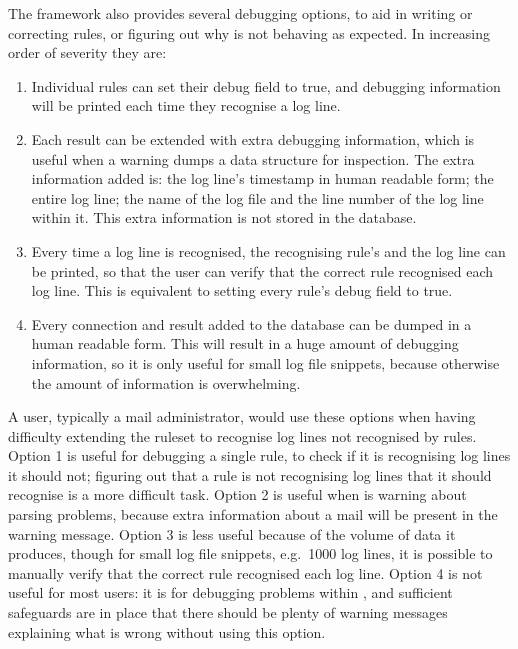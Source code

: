 The framework also provides several debugging options, to aid in writing or
correcting rules, or figuring out why \parsername{} is not behaving as
expected.  In increasing order of severity they are:

\begin{enumerate}

    \item Individual rules can set their debug field to true, and debugging
        information will be printed each time they recognise a log line.

    \item Each result can be extended with extra debugging information,
        which is useful when a warning dumps a data structure for
        inspection.  The extra information added is: the log line's
        timestamp in human readable form; the entire log line; the name of
        the log file and the line number of the log line within it.  This
        extra information is not stored in the database.

    \item Every time a log line is recognised, the recognising rule's
         and the log line can be printed, so that the user
        can verify that the correct rule recognised each log line.  This is
        equivalent to setting every rule's debug field to true.

    \item Every connection and result added to the database can be dumped
        in a human readable form.  This will result in a huge amount of
        debugging information, so it is only useful for small log file
        snippets, because otherwise the amount of information is
        overwhelming.

\end{enumerate}

A user, typically a mail administrator, would use these options when having
difficulty extending the ruleset to recognise log lines not recognised by
\parsernames{} \numberOFrules{} rules.  Option 1 is useful for debugging a
single rule, to check if it is recognising log lines it should not;
figuring out that a rule is not recognising log lines that it should
recognise is a more difficult task.  Option 2 is useful when \parsername{}
is warning about parsing problems, because extra information about a mail
will be present in the warning message.  Option 3 is less useful because of
the volume of data it produces, though for small log file snippets, e.g.\
1000 log lines, it is possible to manually verify that the correct rule
recognised each log line.  Option 4 is not useful for most users: it is for
debugging problems within \parsername{}, and sufficient safeguards are in
place that there should be plenty of warning messages explaining what is
wrong without using this option.

